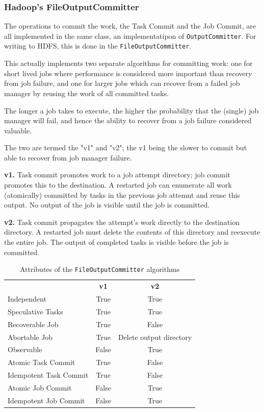 \documentclass[conference]{IEEEtran}
\begin{document}
\subsubsection{Hadoop's FileOutputCommitter}

The operations to commit the work, the Task Commit and the Job Commit,
are all implemented in the same class, an implementatipon of \texttt{OutputCommitter}.
For writing to HDFS, this is done in the \texttt{FileOutputCommitter}.

This actually implements two separate algorithms for committing work: one for
short lived jobs where performance is considered more important than recovery
from job failure, and one for larger jobs which can recover from a failed job manager
by reusing the work of all committed tasks.

The longer a job takes to execute, the higher the probability that the (single)
job manager will fail, and hence the ability to recover from a job failure
considered valuable.


The two are termed the "v1" and "v2";
the v1 being the slower to commit but able to recover from job manager failure.


\textbf{v1.}
Task commit promotes work to a job attempt directory;
job commit promotes this to the destination.
A restarted job can enumerate all work (atomically)
committed by tasks in the previous job attemnt and reuse this output.
No output of the job is visible until the job is committed.


\textbf{v2.}
Task commit propagates the attempt's work directly to the destination directory.
A restarted job must delete the contents of this directory and reexecute
the entire job.
The output of completed tasks is visible before the job is committed.

\begin{table}
  \caption{Attributes of the \texttt{FileOutputCommitter} algorithms}
  \begin{tabular}{ l c c }
    \hline
    & \textbf{v1} & \textbf{v2} \\
    Independent & True & True \\
    Speculative Tasks & True & True \\
    Recoverable Job & True & False \\
    Abortable Job & True & Delete output directory \\
    Observable & False & True \\
    Atomic Task Commit & True & False \\
    Idempotent Task Commit & True & False \\
    Atomic Job Commit & False & True \\
    Idempotent Job Commit & False & True \\
    \hline
  \end{tabular}
  \label{tab:file-committer-attributes}
\end{table}
\end{document}

